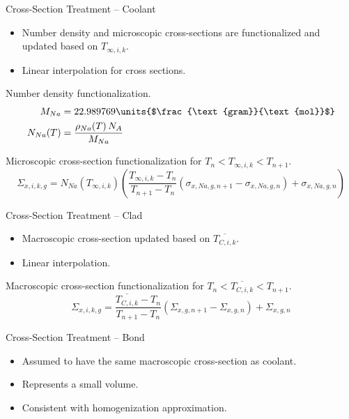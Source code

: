 \begin{frame}{Cross-Section Treatment -- Coolant}
  \begin{itemize}
    \item Number density and microscopic cross-sections are functionalized 
      and updated based on $T_{\infty,i,k}$.
    \item Linear interpolation for cross sections.
  \end{itemize}

  Number density functionalization.
  \begin{align}
    \label{eq:number_density_sodium}
    M_{Na} &= 22.989769 \units{$\frac{\text{gram}}{\text{mol}}$} \\
    N_{Na}(T) &= \frac{\rho_{Na}(T) \, N_A}{M_{Na}}
  \end{align}

  Microscopic cross-section functionalization for ${T_{n} < T_{\infty,i,k} <
  T_{n+1}}$.
  \begin{equation}
    \label{eq:xs_cool}
    \Sigma_{x,i,k,g} = N_{Na}(T_{\infty,i,k}) 
      \left( \frac{T_{\infty,i,k} - T_{n}}{T_{n+1}-T_{n}} 
      (\sigma_{x,Na,g,n+1} - \sigma_{x,Na,g,n})  + \sigma_{x,Na,g,n}\right)
  \end{equation}
\end{frame}

\begin{frame}{Cross-Section Treatment -- Clad}
  \begin{itemize}
    \item Macroscopic cross-section updated based on $\overline{T_{C,i,k}}$.
    \item Linear interpolation.
  \end{itemize}

  Macroscopic cross-section functionalization for ${T_n < \overline{T_{C,i,k}} <
  T_{n+1}}$.
  \begin{equation}
    \label{eq:xs_linear_interpolation}
    \Sigma_{x,i,k,g} = 
      \frac{\overline{T_{C,i,k}} - T_{n}}{T_{n+1}-T_{n}} 
      (\Sigma_{x,g,n+1} - \Sigma_{x,g,n})  + \Sigma_{x,g,n}
  \end{equation}
\end{frame}

\begin{frame}{Cross-Section Treatment -- Bond}
  \begin{itemize}
    \item Assumed to have the same macroscopic cross-section as coolant.
    \item Represents a small volume.
    \item Consistent with homogenization approximation.
  \end{itemize}
\end{frame}

